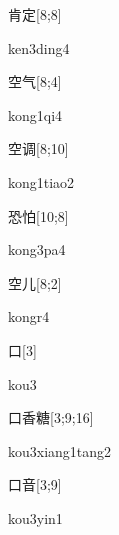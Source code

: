 \begin{verbete}{肯定}[8;8]
\begin{pronuncia}{ken3ding4}
\end{pronuncia}
\end{verbete}

\begin{verbete}[kong1qi4]{空气}[8;4]
\begin{pronuncia}{kong1qi4}
\end{pronuncia}
\end{verbete}

\begin{verbete}{空调}[8;10]
\begin{pronuncia}{kong1tiao2}
\end{pronuncia}
\end{verbete}

\begin{verbete}[kong3pa4]{恐怕}[10;8]
\begin{pronuncia}{kong3pa4}
\end{pronuncia}
\end{verbete}

\begin{verbete}[kongr4]{空儿}[8;2]
\begin{pronuncia}{kongr4}
\end{pronuncia}
\end{verbete}

\begin{verbete}[kou3]{口}[3]
\begin{pronuncia}{kou3}
\end{pronuncia}
\end{verbete}

\begin{verbete}{口香糖}[3;9;16]
\begin{pronuncia}[\\]{kou3xiang1tang2}
\end{pronuncia}
\end{verbete}

\begin{verbete}{口音}[3;9]
\begin{pronuncia}{kou3yin1}
\end{pronuncia}
\end{verbete}

